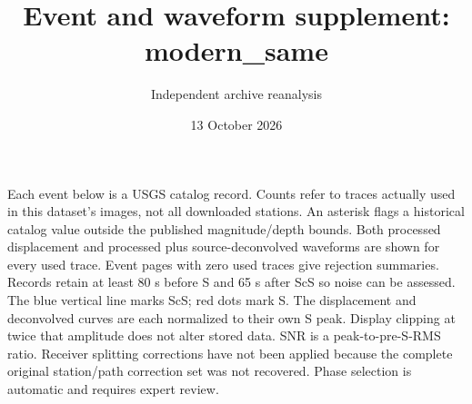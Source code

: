 \documentclass[10pt]{article}
\begin{document}
\title{Event and waveform supplement: modern\_same}\author{Independent archive reanalysis}\date{13 October 2026}\maketitle
Each event below is a USGS catalog record. Counts refer to traces actually
used in this dataset's images, not all downloaded stations. An asterisk flags a
historical catalog value outside the published magnitude/depth bounds. Both
processed displacement and processed plus source-deconvolved waveforms are shown
for every used trace. Event pages with zero used traces give rejection summaries.
Records retain at least 80 s before S and 65 s after ScS so noise can be assessed.
The blue vertical line marks ScS; red dots mark S. The displacement and deconvolved
curves are each normalized to their own S peak. Display clipping at twice that
amplitude does not alter stored data. SNR is a peak-to-pre-S-RMS ratio.
Receiver splitting corrections have not been applied because the complete original station/path
correction set was not recovered. Phase selection is automatic and requires expert review.
\begingroup\small\setlength{\tabcolsep}{3pt}
\end{document}
